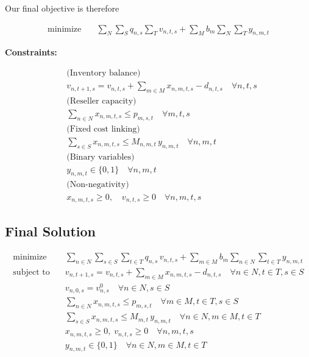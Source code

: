 \documentclass[11pt]{article}
\begin{document}
Our final objective is therefore

\begin{align}
  \text{minimize} & \quad \sum_{N} \sum_{S} q_{n,s} \sum_{T} v_{n,t,s} + \sum_{M} b_m \sum_{N} \sum_{T} y_{n,m,t}
\end{align}

\textbf{Constraints:}

\begin{align}
&\text{(Inventory balance)} \\
&v_{n,t+1,s}
=
v_{n,t,s}
+
\sum_{m \in M} x_{n,m,t,s}
-
d_{n,t,s}
\quad \forall n,t,s
\\[6pt]
&\text{(Reseller capacity)} \\
&\sum_{n \in N} x_{n,m,t,s}
\le p_{m,s,t}
\quad \forall m,t,s
\\[6pt]
&\text{(Fixed cost linking)} \\
&\sum_{s \in S} x_{n,m,t,s}
\le M_{n,m,t} \, y_{n,m,t}
\quad \forall n,m,t
\\[6pt]
&\text{(Binary variables)} \\
&y_{n,m,t} \in \{0,1\}
\quad \forall n,m,t
\\[6pt]
&\text{(Non-negativity)} \\
&x_{n,m,t,s} \ge 0,\quad v_{n,t,s} \ge 0
\quad \forall n,m,t,s
\end{align}

\subsection{Final Solution}
\begin{align}
\text{minimize} \quad
& \sum_{n \in N} \sum_{s \in S} \sum_{t \in T} q_{n,s} \, v_{n,t,s}
+ \sum_{m \in M} b_m \sum_{n \in N} \sum_{t \in T} y_{n,m,t}
\\[6pt]
\text{subject to} \quad
& v_{n,t+1,s}
=
v_{n,t,s}
+
\sum_{m \in M} x_{n,m,t,s}
-
d_{n,t,s}
\quad \forall n \in N, t \in T, s \in S
\\[6pt]
& v_{n,0,s} = v^{0}_{n,s}
\quad \forall n \in N, s \in S
\\[6pt]
& \sum_{n \in N} x_{n,m,t,s}
\le p_{m,s,t}
\quad \forall m \in M, t \in T, s \in S
\\[6pt]
& \sum_{s \in S} x_{n,m,t,s}
\le M_{m,t} \, y_{n,m,t}
\quad \forall n \in N, m \in M, t \in T
\\[6pt]
& x_{n,m,t,s} \ge 0,\; v_{n,t,s} \ge 0
\quad \forall n,m,t,s
\\[6pt]
& y_{n,m,t} \in \{0,1\}
\quad \forall n \in N, m \in M, t \in T
\end{align}
\end{document}
